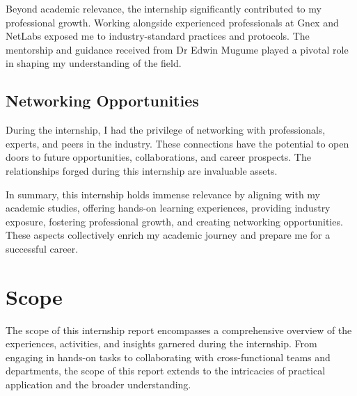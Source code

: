 Beyond academic relevance, the internship significantly contributed to my professional growth. Working alongside experienced professionals at Gnex and NetLabs exposed me to industry-standard practices and protocols. The mentorship and guidance received from Dr Edwin Mugume played a pivotal role in shaping my understanding of the field.

\subsection{Networking Opportunities}

During the internship, I had the privilege of networking with professionals, experts, and peers in the industry. These connections have the potential to open doors to future opportunities, collaborations, and career prospects. The relationships forged during this internship are invaluable assets.

In summary, this internship holds immense relevance by aligning with my academic studies, offering hands-on learning experiences, providing industry exposure, fostering professional growth, and creating networking opportunities. These aspects collectively enrich my academic journey and prepare me for a successful career.
\section{Scope}

The scope of this internship report encompasses a comprehensive overview of the experiences, activities, and insights garnered during the internship. From engaging in hands-on tasks  to collaborating with cross-functional teams and departments, the scope of this report extends to the intricacies of practical application and the broader understanding.

